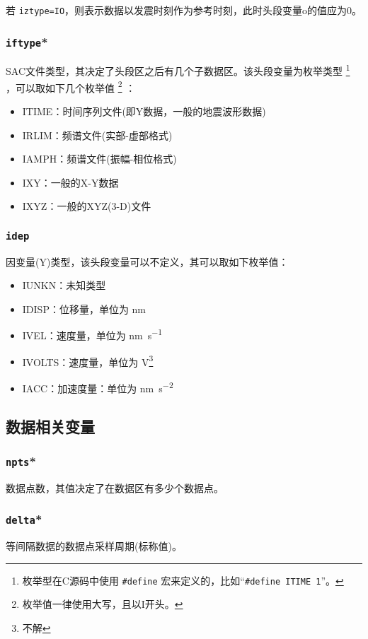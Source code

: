 若 \texttt{iztype=IO}，则表示数据以发震时刻作为参考时刻，此时头段变量o的值应为0。

\subsubsection{\texttt{iftype}*}
SAC文件类型，其决定了头段区之后有几个子数据区。该头段变量为枚举类型
\footnote{枚举型在C源码中使用 \verb|#define| 宏来定义的，比如``\verb|#define ITIME 1|''。}
，可以取如下几个枚举值
\footnote{枚举值一律使用大写，且以I开头。} ：
\begin{itemize}
\ttfamily
\item ITIME：时间序列文件(即Y数据，一般的地震波形数据)
\item IRLIM：频谱文件(实部-虚部格式)
\item IAMPH：频谱文件(振幅-相位格式)
\item IXY：一般的X-Y数据
\item IXYZ：一般的XYZ(3-D)文件
\end{itemize}

\subsubsection{\texttt{idep}}
因变量(Y)类型，该头段变量可以不定义，其可以取如下枚举值：
\begin{itemize}
\ttfamily
\item IUNKN：未知类型
\item IDISP：位移量，单位为 \si{\nm}
\item IVEL：速度量，单位为 \si{\nm\per\s}
\item IVOLTS：速度量，单位为 \si{\V}\footnote{不解}
\item IACC：加速度量：单位为 \si{\nm\per\square\s}
\end{itemize}

\subsection{数据相关变量}
\subsubsection{\texttt{npts}*}
数据点数，其值决定了在数据区有多少个数据点。

\subsubsection{\texttt{delta}*}
等间隔数据的数据点采样周期(标称值)。

